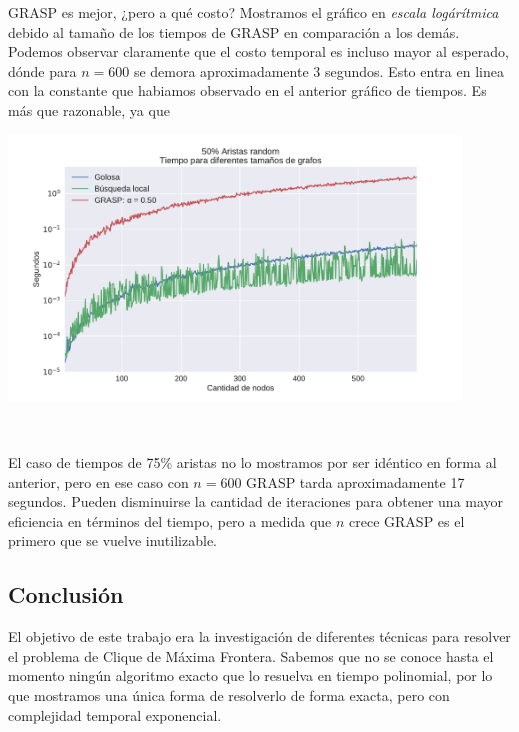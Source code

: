 GRASP es mejor, ¿pero a qué costo? Mostramos el gráfico en \textit{escala logárítmica} debido al tamaño de los tiempos de GRASP en comparación a los demás. Podemos observar claramente que el costo temporal es incluso mayor al esperado, dónde para $n = 600$ se demora aproximadamente 3 segundos. Esto entra en linea con la constante que habiamos observado en el anterior gráfico de tiempos. Es más que razonable, ya que  \\

{\centering
    \includegraphics[width=0.9\textwidth]{informe/imgs/exp_random50_tiempo_todos_ngrande_logy.pdf}

}
$ $ \newline

El caso de tiempos de 75\% aristas no lo mostramos por ser idéntico en forma al anterior, pero en ese caso con $n = 600$ GRASP tarda aproximadamente 17 segundos. Pueden disminuirse la cantidad de iteraciones para obtener una mayor eficiencia en términos del tiempo, pero a medida que $n$ crece GRASP es el primero que se vuelve inutilizable.



\subsection{Conclusión}

El objetivo de este trabajo era la investigación de diferentes técnicas para resolver el problema de Clique de Máxima Frontera. Sabemos que no se conoce hasta el momento ningún algoritmo exacto que lo resuelva en tiempo polinomial, por lo que mostramos una única forma de resolverlo de forma exacta, pero con complejidad temporal exponencial. \\


